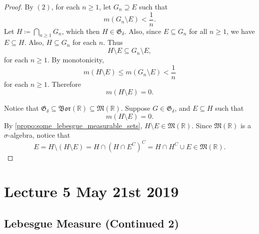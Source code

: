 \documentclass[notoc,notitlepage]{tufte-book}
\newcommand{\Bor}{\mathfrak{Bor}}
\begin{document}
\begin{proof}
  \noindent
   By $(2)$, for each $n \geq 1$, let $G_n
  \supseteq E$ such that
  \begin{equation*}
    m (G_n \setminus E) < \frac{1}{n}.
  \end{equation*}
  Let $H \coloneqq \bigcap_{n \geq 1} G_n$, which then $H \in
  \mathfrak{G}_{\delta}$. Also, since $E \subseteq G_n$ for all $n \geq 1$, we
  have $E \subseteq H$. Also, $H \subseteq G_n$ for each $n$. Thus
  \begin{equation*}
    H \setminus E \subseteq G_n \setminus E,
  \end{equation*}
  for each $n \geq 1$. By monotonicity,
  \begin{equation*}
    m(H \setminus E) \leq m(G_n \setminus E) < \frac{1}{n}
  \end{equation*}
  for each $n \geq 1$. Therefore
  \begin{equation*}
    m(H \setminus E) = 0.
  \end{equation*}

  \noindent
   Notice that $\mathfrak{G}_{\delta} \subseteq
  \Bor(\mathbb{R}) \subseteq \mathfrak{M}(\mathbb{R})$. Suppose $G \in
  \mathfrak{G}_{\delta}$, and $E \subseteq H$ such that
  \begin{equation*}
    m(H \setminus E) = 0.
  \end{equation*}
  By \cref{propo:some_lebesgue_measurable_sets}, $H \setminus E \in
  \mathfrak{M}(\mathbb{R})$. Since $\mathfrak{M}(\mathbb{R})$ is a
  $\sigma$-algebra, notice that
  \begin{equation*}
    E = H \setminus (H \setminus E) = H \cap (H \cap E^C)^C = H \cap H^C \cup E
    \in \mathfrak{M}(\mathbb{R}).
  \end{equation*}
\end{proof}



\chapter{Lecture 5 May 21st 2019}%
\label{chp:lecture_5_may_21st_2019}

\section{Lebesgue Measure (Continued 2)}%
\label{sec:lebesgue_measure_continued_2}
\end{document}
